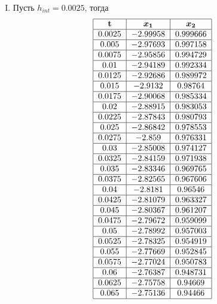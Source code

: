 \documentclass[a4paper,11pt]{article}
\begin{document}
\begin{enumerate}[I.]
  \item Пусть $h_{int} = 0.0025$, тогда
  \begin{align*}
    &\begin{tabular}{ | c | c | c | }
      \hline
      $\textbf{t}$ & \bm{$x_1$} & \bm{$x_2$} \\ \hline
      $0.0025$ & $-2.99958$ & $0.999666$ \\ \hline
      $0.005$ & $-2.97693$ & $0.997158$ \\ \hline
      $0.0075$ & $-2.95856$ & $0.994729$ \\ \hline
      $0.01$ & $-2.94189$ & $0.992334$ \\ \hline
      $0.0125$ & $-2.92686$ & $0.989972$ \\ \hline
      $0.015$ & $-2.9132$ & $0.98764$ \\ \hline
      $0.0175$ & $-2.90068$ & $0.985334$ \\ \hline
      $0.02$ & $-2.88915$ & $0.983053$ \\ \hline
      $0.0225$ & $-2.87843$ & $0.980793$ \\ \hline
      $0.025$ & $-2.86842$ & $0.978553$ \\ \hline
      $0.0275$ & $-2.859$ & $0.976331$ \\ \hline
      $0.03$ & $-2.85008$ & $0.974127$ \\ \hline
      $0.0325$ & $-2.84159$ & $0.971938$ \\ \hline
      $0.035$ & $-2.83346$ & $0.969765$ \\ \hline
      $0.0375$ & $-2.82565$ & $0.967606$ \\ \hline
      $0.04$ & $-2.8181$ & $0.96546$ \\ \hline
      $0.0425$ & $-2.81079$ & $0.963327$ \\ \hline
      $0.045$ & $-2.80367$ & $0.961207$ \\ \hline
      $0.0475$ & $-2.79672$ & $0.959099$ \\ \hline
      $0.05$ & $-2.78992$ & $0.957003$ \\ \hline
      $0.0525$ & $-2.78325$ & $0.954919$ \\ \hline
      $0.055$ & $-2.77669$ & $0.952845$ \\ \hline
      $0.0575$ & $-2.77024$ & $0.950783$ \\ \hline
      $0.06$ & $-2.76387$ & $0.948731$ \\ \hline
      $0.0625$ & $-2.75758$ & $0.94669$ \\ \hline
      $0.065$ & $-2.75136$ & $0.94466$ \\ \hline

\end{tabular}
\end{align*}
\end{enumerate}
\end{document}
